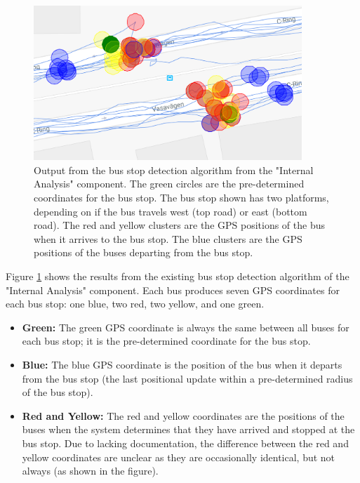 \begin{figure}[ht!]
    \centering
    \includegraphics[width=0.9\textwidth]{figures/bus_stops}
    \caption[Output from the bus stop detection algorithm from the "Internal Analysis" component]
    {\small Output from the bus stop detection algorithm from the "Internal Analysis" component.
    The green circles are the pre-determined coordinates for the bus stop.
    The bus stop shown has two platforms, depending on if the bus travels west (top road) or east (bottom road).
    The red and yellow clusters are the GPS positions of the bus when it arrives to the bus stop.
    The blue clusters are the GPS positions of the buses departing from the bus stop.
    }
    \label{fig:bus-stop-clusters}
\end{figure}

Figure \ref{fig:bus-stop-clusters} shows the results from the existing bus stop detection algorithm of the "Internal Analysis" component.
Each bus produces seven GPS coordinates for each bus stop: one blue, two red, two yellow, and one green.
\begin{itemize}
    \item \textbf{Green:} The green GPS coordinate is always the same between all buses for each bus stop; it is the pre-determined coordinate for the bus stop.
    \item \textbf{Blue:} The blue GPS coordinate is the position of the bus when it departs from the bus stop (the last positional update within a pre-determined radius of the bus stop).
    \item \textbf{Red and Yellow:} The red and yellow coordinates are the positions of the buses when the system determines that they have arrived and stopped at the bus stop.
    Due to lacking documentation, the difference between the red and yellow coordinates are unclear as they are occasionally identical, but not always (as shown in the figure).
\end{itemize}

